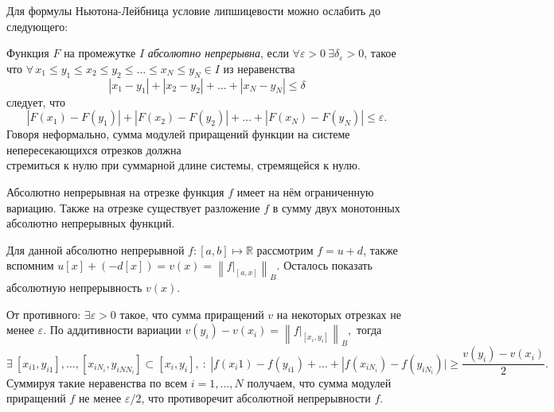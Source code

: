 
Для формулы Ньютона-Лейбница условие липшицевости можно ослабить до следующего:

\begin{to_def}
    Функция $F$ на промежутке $I$ \textit{абсолютно непрерывна}, если $\forall \varepsilon > 0 \ \exists \delta_\varepsilon > 0$, такое что
    $\forall \, x_1 \leq y_1 \leq x_2 \leq y_2 \leq \ldots \leq x_N \leq y_N \in I$ из неравенства
    \begin{equation*}
        |x_1 - y_1| + |x_2 - y_2| + \ldots + |x_N - y_N| \leq \delta
    \end{equation*}
    следует, что
    \begin{equation*}
        |F(x_1)-F(y_1)| + 
        |F(x_2)-F(y_2)| + 
        \ldots +
        |F(x_N)-F(y_N)| \leq \varepsilon.
    \end{equation*}
    Говоря неформально, сумма модулей приращений функции на системе непересекающихся отрезков должна \\ стремиться к нулю при суммарной длине системы, стремящейся к нулю.
\end{to_def}




\begin{to_lem}
    Абсолютно непрерывная на отрезке функция $f$ имеет на нём ограниченную вариацию. Также на отрезке существует разложение $f$ в сумму двух монотонных абсолютно непрерывных функций.
\end{to_lem}

\begin{uproof}
    Для данной абсолютно непрерывной $f \colon  [a, b] \mapsto \mathbb{R}$ рассмотрим $f = u + d$, также вспомним $u[x] + (-d[x]) = v(x) = \left\|f|_{[a, x]}\right\|_B$. Осталось показать абсолютную непрерывность $v(x)$.

    От противного: $\exists  \varepsilon > 0$ такое, что сумма приращений $v$ на некоторых отрезках не менее $\varepsilon$. По аддитивности вариации $v(y_i) - v(x_i) = \left\|f|_{[x_i, y_i]}\right\|_B,$ тогда
    \begin{equation*}
        \exists \ [x_{i1}, y_{i1}], \ldots, [x_{iN_i}, y_{iNN_i}] \subset [x_i, y_i], \ \colon  \ |f(x_i1) - f(y_{i1}) + \ldots + |f(x_{i N_i}) - f(y_{iN_i})|
        \geq \frac{v(y_i) - v(x_i)}{2}.
    \end{equation*}
    Суммируя такие неравенства по всем $i = 1, \ldots, N$ получаем, что сумма модулей приращений $f$ не менее $\varepsilon/2$, что противоречит абсолютной непрерывности $f$. 
\end{uproof}



